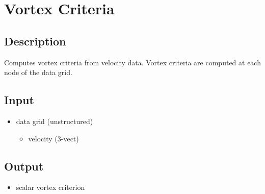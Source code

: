 \section{Vortex Criteria}
\label{sec:vortex-criteria}


\subsection{Description}
Computes vortex criteria from velocity data. Vortex criteria are computed at each node of the data grid.
 

\subsection{Input}
\begin{itemize}
\item
  data grid (unstructured)
  \begin{itemize}
  \item
    velocity (3-vect)
  \end{itemize}
\end{itemize}


\subsection{Output}
\begin{itemize}
\item
  scalar vortex criterion
\end{itemize}


